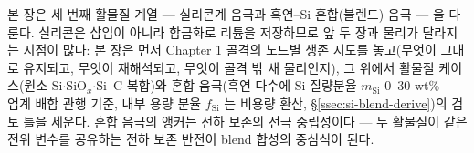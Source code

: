 본 장은 세 번째 활물질 계열 --- 실리콘계 음극과 흑연--Si 혼합(블렌드) 음극 --- 을 다룬다. 실리콘은
삽입이 아니라 합금화로 리튬을 저장하므로 앞 두 장과 물리가 달라지는 지점이 많다: 본 장은 먼저
Chapter 1 골격의 노드별 생존 지도를 놓고(무엇이 그대로 유지되고, 무엇이 재해석되고, 무엇이 골격 밖 새
물리인지), 그 위에서 활물질 케이스(원소 Si$\cdot$SiO$_x$$\cdot$Si--C 복합)와 혼합 음극(흑연 다수에
Si 질량분율 $m_\mathrm{Si}$ 0--30 wt\% --- 업계 배합 관행 기준, 내부 용량 분율 $f_\mathrm{Si}$ 는 비용량 환산, \S\ref{ssec:si-blend-derive})의 검토 틀을 세운다. 혼합 음극의 앵커는 전하 보존의 전극
중립성이다 --- 두 활물질이 같은 전위 변수를 공유하는 전하 보존 반전이 blend 합성의 중심식이 된다.

\tableofcontents
\clearpage
